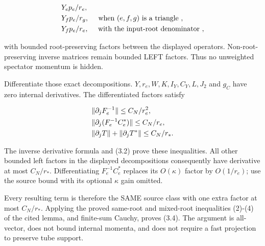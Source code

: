 \begin{gather*}
\begin{aligned}
& Y_{e} p_{e}/r_{e}, \\
& Y_{f} p_{e}/r_{g}, \quad  \text{ when } (e,f,g) \text{ is a triangle }, \\
& Y_{f} p_{e}/r_{e}, \quad  \text{ with the input-root denominator },
\end{aligned}\notag
\end{gather*}

with bounded root-preserving factors between the displayed operators.
Non-root-preserving inverse matrices remain bounded LEFT factors. Thus
no unweighted spectator momentum is hidden.

Differentiate those exact decompositions.
\(Y, r_{e}, W, K, I_{Y}, C_{Y}, L, J_{2}\) and \(g_{C}\) have zero
internal derivatives. The differentiated factors satisfy

\begin{gather*}
\begin{aligned}
& \Vert \partial _{j} F_{e}^{-1}\Vert  \le  C_{N}/r_{e}^{2}, \\
& \Vert \partial _{j}(F_{e}^{-1} C_{e}^{*})\Vert  \le  C_{N}/r_{e}, \\
& \Vert \partial _{j} T\Vert +\Vert \partial _{j} T^{*}\Vert  \le  C_{N}/r_{*}.
\end{aligned}\notag
\end{gather*}

The inverse derivative formula and (3.2) prove these inequalities. All
other bounded left factors in the displayed decompositions consequently
have derivative at most \(C_{N}/r_{*}\). Differentiating
\(F_{e}^{-1} C_{e}^{*}\) replaces its \(O(\kappa )\) factor by
\(O(1/r_{e})\); use the source bound with its optional \(\kappa\) gain
omitted.

Every resulting term is therefore the SAME source class with one extra
factor at most \(C_{N}/r_{*}\). Applying the proved same-root and
mixed-root inequalities (2)-(4) of the cited lemma, and finite-sum
Cauchy, proves (3.4). The argument is all-vector, does not bound
internal momenta, and does not require a fast projection to preserve
tube support.

